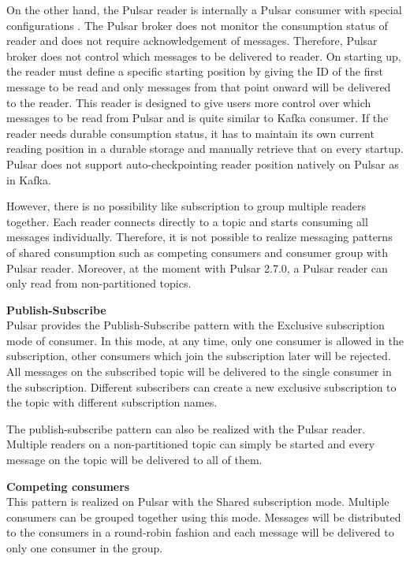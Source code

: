 On the other hand, the Pulsar reader is internally a Pulsar consumer with special configurations \cite{pulsarconceptclients}. The Pulsar broker does not monitor the consumption status of reader and does not require acknowledgement of messages. Therefore, Pulsar broker does not control which messages to be delivered to reader. On starting up, the reader must define a specific starting position by giving the ID of the first message to be read and only messages from that point onward will be delivered to the reader. This reader is designed to give users more control over which messages to be read from Pulsar and is quite similar to Kafka consumer. If the reader needs durable consumption status, it has to maintain its own current reading position in a durable storage and manually retrieve that on every startup. Pulsar does not support auto-checkpointing reader position natively on Pulsar as in Kafka. 

However, there is no possibility like subscription to group multiple readers together. Each reader connects directly to a topic and starts consuming all messages individually. Therefore, it is not possible to realize messaging patterns of shared consumption such as competing consumers and consumer group with Pulsar reader. Moreover, at the moment with Pulsar 2.7.0, a Pulsar reader can only read from non-partitioned topics.

\textbf{Publish-Subscribe}\\
Pulsar provides the Publish-Subscribe pattern with the Exclusive subscription mode of consumer. In this mode, at any time, only one consumer is allowed in the subscription, other consumers which join the subscription later will be rejected. All messages on the subscribed topic will be delivered to the single consumer in the subscription. Different subscribers can create a new exclusive subscription to the topic with different subscription names.

The publish-subscribe pattern can also be realized with the Pulsar reader. Multiple readers on a non-partitioned topic can simply be started and every message on the topic will be delivered to all of them. 

\textbf{Competing consumers}\\
This pattern is realized on Pulsar with the Shared subscription mode. Multiple consumers can be grouped together using this mode. Messages will be distributed to the consumers in a round-robin fashion and each message will be delivered to only one consumer in the group.

